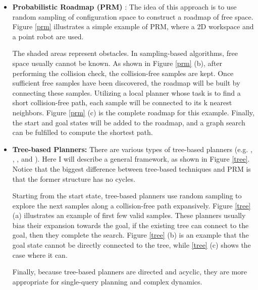\begin{itemize}
    \item \textbf{Probabilistic Roadmap (PRM)} \citep{Kavraki1996ProbabilisticRF}: The idea of this approach is to use random sampling of configuration space to construct a roadmap of free space. Figure \ref{prm} illustrates a simple example of PRM, where a 2D workspace and a point robot are used.
    
    The shaded areas represent obstacles. In sampling-based algorithms, free space usually cannot be known. As shown in Figure \ref{prm} (b), after performing the collision check, the collision-free samples are kept. Once sufficient free samples have been discovered, the roadmap will be built by connecting these samples. Utilizing a local planner whose task is to find a short collision-free path, each sample will be connected to its k nearest neighbors. Figure \ref{prm} (c) is the complete roadmap for this example. Finally, the start and goal states will be added to the roadmap, and a graph search can be fulfilled to compute the shortest path.
    
    \item \textbf{Tree-based Planners:} There are various types of tree-based planners (e.g. \citep{RRT}, \citep{Sucan2012AST}, \citep{inproceedings}, and \citep{hsu}). Here I will describe a general framework, as shown in Figure \ref{tree}. Notice that the biggest difference between tree-based techniques and PRM is that the former structure has no cycles.
    
    Starting from the start state, tree-based planners use random sampling to explore the next samples along a collision-free path expansively. Figure \ref{tree} (a) illustrates an example of first few valid samples. These planners usually bias their expansion towards the goal, if the existing tree can connect to the goal, then they complete the search. Figure \ref{tree} (b) is an example that the goal state cannot be directly connected to the tree, while \ref{tree} (c) shows the case where it can.
    
    Finally, because tree-based planners are directed and acyclic, they are more appropriate for single-query planning and complex dynamics.
\end{itemize}

